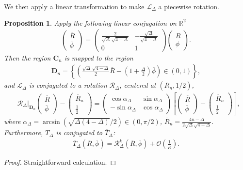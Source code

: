 \documentclass{article}
\numberwithin{figure}{section}
\numberwithin{equation}{section}
\newtheorem{proposition}[lemma]{Proposition}
\theoremstyle{remark}
\theoremstyle{definition}
\begin{document}
We then apply a linear transformation to make $\mathcal{L}_\Delta$ a piecewise rotation.
\begin{proposition}\label{linear}
	Apply the following linear conjugation on $\mathbb{R}^2$
	\begin{align}
		\begin{pmatrix}
			\overline{R}\\
			\overline{\phi}
		\end{pmatrix}
		=
		\begin{pmatrix}
			\frac{2}{\sqrt{\Delta}\,\sqrt{4-\Delta}} & -\frac{\sqrt{\Delta}}{\sqrt{4-\Delta}}\\
			0 & 1
		\end{pmatrix}
		\begin{pmatrix}
			R\\
			\phi
		\end{pmatrix}.
	\end{align}
	Then the region  $\mathbf{C}_n$ is mapped to the region
	\begin{align*}
		\mathbf{D}_n=\left\{\left(\frac{\sqrt{\Delta}\,\sqrt{4-\Delta}}{2}\overline{R}-(1+\frac{\Delta}{2})\overline{\phi}\right)\in(0,1)\right\},
	\end{align*}
	and $\mathcal{L}_\Delta$ is conjugated to a rotation $\mathcal{R}_\Delta$,  centered at $(\overline{R}_n,1/2)$,
	\begin{align*}
		&\mathcal{R}_\Delta|_{\mathbf{D}_n}
		\begin{pmatrix}
			\overline{R}\\
			\overline{\phi}
		\end{pmatrix}
		-
		\begin{pmatrix}
			\overline{R}_n\\
			\frac{1}{2}
		\end{pmatrix}
		=
		\begin{pmatrix}
			\cos\alpha_\Delta&\sin\alpha_\Delta\\
			-\sin\alpha_\Delta&\cos\alpha_\Delta
		\end{pmatrix}
		\left[
		\begin{pmatrix}
			\overline{R}\\
			\overline{\phi}
		\end{pmatrix}
		-
		\begin{pmatrix}
			\overline{R}_n\\
			\frac{1}{2}
		\end{pmatrix}
		\right],
	\end{align*}
	where $\alpha_\Delta=\arcsin(\sqrt{\Delta(4-\Delta)}/2)\in(0,\pi/2)$, $\overline{R}_n=\frac{4n-\Delta}{2\sqrt{\Delta}\sqrt{4-\Delta}}$. Furthermore, $T_\Delta$ is conjugated to $\overline{T}_\Delta$:
	\begin{align}\label{linear_rotate}
		\overline{T}_\Delta(\overline{R},\overline{\phi})=\mathcal{R}_\Delta^k(\overline{R},\overline{\phi})+\mathcal{O}\left(\frac{1}{\overline{R}}\right).
	\end{align}
\end{proposition}
\begin{proof}
	Straightforward calculation.
\end{proof}
\end{document}

